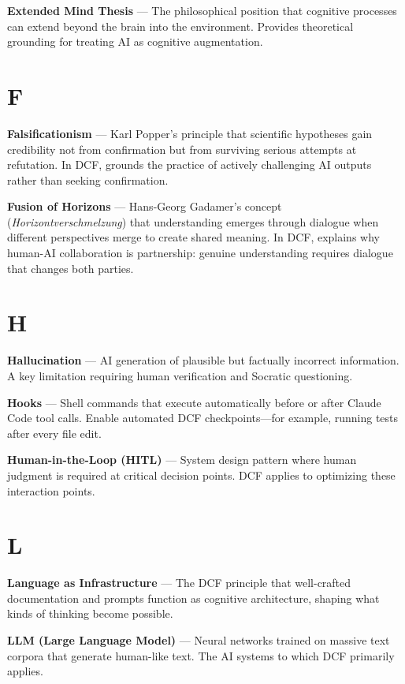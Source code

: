 \textbf{Extended Mind Thesis} --- The philosophical position that cognitive processes can extend beyond the brain into the environment. Provides theoretical grounding for treating AI as cognitive augmentation.

\section*{F}

\textbf{Falsificationism} --- Karl Popper's principle that scientific hypotheses gain credibility not from confirmation but from surviving serious attempts at refutation. In DCF, grounds the practice of actively challenging AI outputs rather than seeking confirmation.

\textbf{Fusion of Horizons} --- Hans-Georg Gadamer's concept (\emph{Horizontverschmelzung}) that understanding emerges through dialogue when different perspectives merge to create shared meaning. In DCF, explains why human-AI collaboration is partnership: genuine understanding requires dialogue that changes both parties.

\section*{H}

\textbf{Hallucination} --- AI generation of plausible but factually incorrect information. A key limitation requiring human verification and Socratic questioning.

\textbf{Hooks} --- Shell commands that execute automatically before or after Claude Code tool calls. Enable automated DCF checkpoints---for example, running tests after every file edit.

\textbf{Human-in-the-Loop (HITL)} --- System design pattern where human judgment is required at critical decision points. DCF applies to optimizing these interaction points.

\section*{L}

\textbf{Language as Infrastructure} --- The DCF principle that well-crafted documentation and prompts function as cognitive architecture, shaping what kinds of thinking become possible.

\textbf{LLM (Large Language Model)} --- Neural networks trained on massive text corpora that generate human-like text. The AI systems to which DCF primarily applies.

